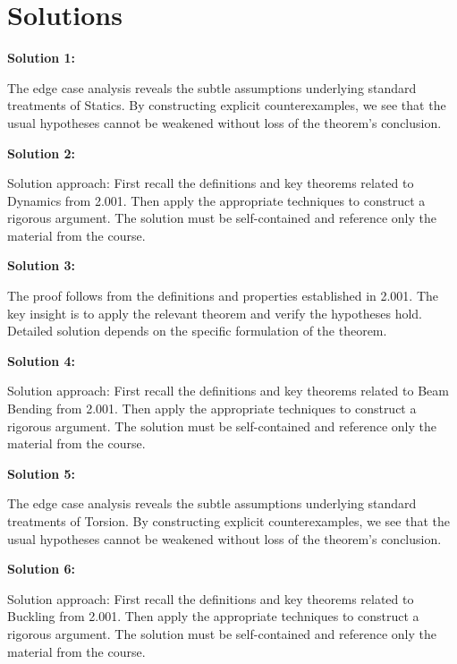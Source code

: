 \documentclass[12pt,a4paper]{exam}
\begin{document}
\newpage
\section*{Solutions}

\textbf{Solution 1:}

The edge case analysis reveals the subtle assumptions underlying standard treatments of Statics. By constructing explicit counterexamples, we see that the usual hypotheses cannot be weakened without loss of the theorem's conclusion.

\vspace{0.5cm}

\textbf{Solution 2:}

Solution approach: First recall the definitions and key theorems related to Dynamics from 2.001. Then apply the appropriate techniques to construct a rigorous argument. The solution must be self-contained and reference only the material from the course.

\vspace{0.5cm}

\textbf{Solution 3:}

The proof follows from the definitions and properties established in 2.001. The key insight is to apply the relevant theorem and verify the hypotheses hold. Detailed solution depends on the specific formulation of the theorem.

\vspace{0.5cm}

\textbf{Solution 4:}

Solution approach: First recall the definitions and key theorems related to Beam Bending from 2.001. Then apply the appropriate techniques to construct a rigorous argument. The solution must be self-contained and reference only the material from the course.

\vspace{0.5cm}

\textbf{Solution 5:}

The edge case analysis reveals the subtle assumptions underlying standard treatments of Torsion. By constructing explicit counterexamples, we see that the usual hypotheses cannot be weakened without loss of the theorem's conclusion.

\vspace{0.5cm}

\textbf{Solution 6:}

Solution approach: First recall the definitions and key theorems related to Buckling from 2.001. Then apply the appropriate techniques to construct a rigorous argument. The solution must be self-contained and reference only the material from the course.
\end{document}

